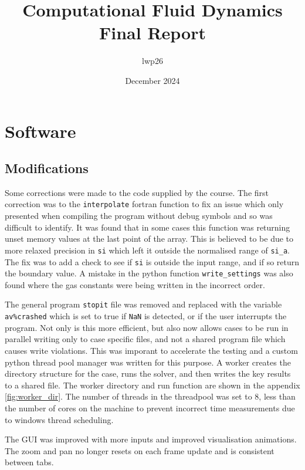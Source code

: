 \documentclass{article}
\begin{document}
\title{Computational Fluid Dynamics \\
    \large Final Report}
\author{lwp26}
\date{December 2024}
\maketitle 

\section{Software}
\subsection{Modifications}

Some corrections were made to the code supplied by the course.
The first correction was to the \texttt{interpolate} fortran function to fix an issue which only presented when compiling the program without debug symbols and so was difficult to identify.
It was found that in some cases this function was returning unset memory values at the last point of the array. This is believed to be due to more relaxed precision in \texttt{si} which left it outside the normalised range of \texttt{si\_a}.
The fix was to add a check to see if \texttt{si} is outside the input range, and if so return the boundary value.
A mistake in the python function \texttt{write\_settings} was also found where the gas constants were being written in the incorrect order.

The general program \texttt{stopit} file was removed and replaced with the variable \texttt{av\%crashed} which is set to true if \texttt{NaN} is detected, or if the user interrupts the program.
Not only is this more efficient, but also now allows cases to be run in parallel writing only to case specific files, and not a shared program file which causes write violations.
This was imporant to accelerate the testing and a custom python thread pool manager was written for this purpose.
A worker creates the directory structure for the case, runs the solver, and then writes the key results to a shared file.
The worker directory and run function are shown in the appendix \ref{fig:worker_dir}.
The number of threads in the threadpool was set to 8, less than the number of cores on the machine to prevent incorrect time measurements due to windows thread scheduling.

The GUI was improved with more inputs and improved visualisation animations.
The zoom and pan no longer resets on each frame update and is consistent between tabs.
\end{document}

